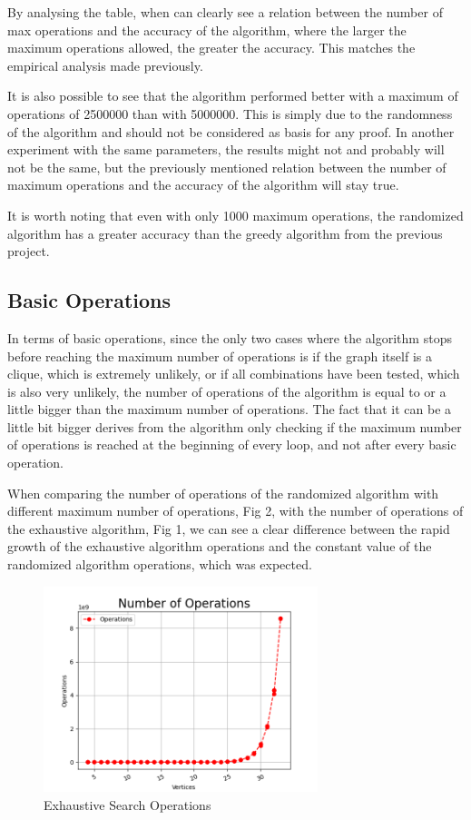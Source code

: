 \documentclass[]{revdetua}
\begin{document}
By analysing the table, when can clearly see a relation between the number of max operations and the accuracy of the algorithm, where the larger the maximum operations allowed, the greater the accuracy. This matches the empirical analysis made previously.

It is also possible to see that the algorithm performed better with a maximum of operations of 2500000 than with 5000000. This is simply due to the randomness of the algorithm and should not be considered as basis for any proof. In another experiment with the same parameters, the results might not and probably will not be the same, but the previously mentioned relation between the number of maximum operations and the accuracy of the algorithm will stay true.

It is worth noting that even with only 1000 maximum operations, the randomized algorithm has a greater accuracy than the greedy algorithm from the previous project.

\subsection{Basic Operations}

In terms of basic operations, since the only two cases where the algorithm stops before reaching the maximum number of operations is if the graph itself is a clique, which is extremely unlikely, or if all combinations have been tested, which is also very unlikely, the number of operations of the algorithm is equal to or a little bigger than the maximum number of operations. The fact that it can be a little bit bigger derives from the algorithm only checking if the maximum number of operations is reached at the beginning of every loop, and not after every basic operation.

When comparing the number of operations of the randomized algorithm with different maximum number of operations, Fig 2, with the number of operations of the exhaustive algorithm, Fig 1, we can see a clear difference between the rapid growth of the exhaustive algorithm operations and the constant value of the randomized algorithm operations, which was expected. 

\begin{figure}[h]
    \centering
    \includegraphics[width=8cm]{operations_exhaustive.png}
    \caption{Exhaustive Search Operations}
\end{figure}
\end{document}
